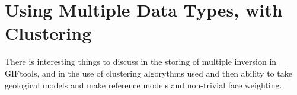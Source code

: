 \section{Using Multiple Data Types, with Clustering}
\label{sec:Using Multiple Data Types, with Clustering}

There is interesting things to discuss in the storing of multiple inversion in GIFtools, and in the use of clustering algorythms used and then ability to take geological models and make reference models and non-trivial face weighting.

\endinput

 Interestingly, the assumption that all magnetizations are in the same direction also assumes that all Koenigsberger ratios are equal.

Any text after an \endinput is ignored.
You could put scraps here or things in progress.

